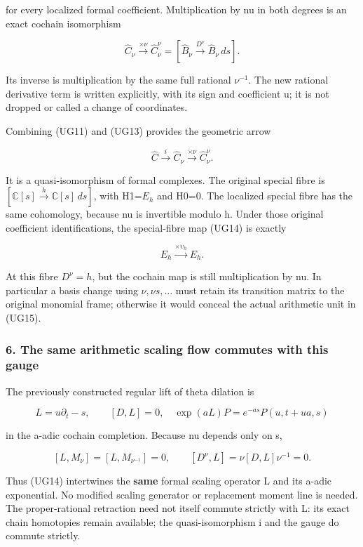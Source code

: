 \documentclass{article}
\begin{document}
for every localized formal coefficient. Multiplication by nu in both degrees is an exact cochain isomorphism

\[
\widehat C_\nu\xrightarrow{\times\nu}
\widehat C_\nu^{\nu}
=[\widehat B_\nu\xrightarrow{D^{\nu}}\widehat B_\nu\,ds].
\tag{UG13}
\]

Its inverse is multiplication by the same full rational \(\nu^{-1}\). The new rational derivative term is written explicitly, with its sign and coefficient u; it is not dropped or called a change of coordinates.

Combining (UG11) and (UG13) provides the geometric arrow

\[
\boxed{\widehat C\xrightarrow{i}\widehat C_\nu
\xrightarrow{\times\nu}\widehat C_\nu^{\nu}.}
\tag{UG14}
\]

It is a quasi-isomorphism of formal complexes. The original special fibre is \([\mathbb C[s]\xrightarrow{h}\mathbb C[s]\,ds]\), with H1=\(E_h\) and H0=0. The localized special fibre has the same cohomology, because nu is invertible modulo h. Under those original coefficient identifications, the special-fibre map (UG14) is exactly

\[
E_h\xrightarrow{\times\upsilon_h}E_h.
\tag{UG15}
\]

At this fibre \(D^\nu=h\), but the cochain map is still multiplication by nu. In particular a basis change using \(\nu,\nu s,\ldots\) must retain its transition matrix to the original monomial frame; otherwise it would conceal the actual arithmetic unit in (UG15).

\subsubsection{6. The same arithmetic scaling flow commutes with this gauge}\label{endpoint-f1_unit_gauge--the-same-arithmetic-scaling-flow-commutes-with-this-gauge}

The previously constructed regular lift of theta dilation is

\[
L=u\partial_t-s,\qquad [D,L]=0,
\quad \exp(aL)P=e^{-as}P(u,t+ua,s)
\tag{UG16}
\]

in the a-adic cochain completion. Because nu depends only on s,

\[
[L,M_\nu]=[L,M_{\nu^{-1}}]=0,
\qquad[D^{\nu},L]=\nu[D,L]\nu^{-1}=0.
\tag{UG17}
\]

Thus (UG14) intertwines the \textbf{same} formal scaling operator L and its a-adic exponential. No modified scaling generator or replacement moment line is needed. The proper-rational retraction need not itself commute strictly with L: its exact chain homotopies remain available; the quasi-isomorphism i and the gauge do commute strictly.
\end{document}
